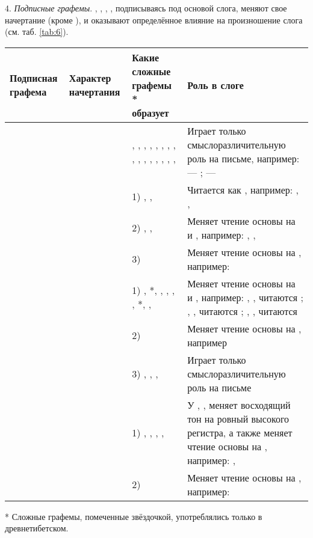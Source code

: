 4. \emph{Подписные графемы}. , , , , подписываясь под основой слога, меняют свое начертание (кроме ), и оказывают определённое влияние на произношение слога (см. таб. \ref{tab:6}).

\begin{tabularx}{\textwidth}{|L{4}|L{4}|L{10}|L{12}|}
	\caption{Подписные графемы}\label{tab:6}\\
	\hline
	Под\-пис\-ная гра\-фе\-ма & Ха\-рак\-тер на\-чер\-та\-ния & Какие сложные графемы * образует & Роль в слоге\\
	\hline
	\endhead
	 &  & , , , , , , , , , , , , , , , ,  & Играет только смыслоразличительную роль на письме, например:
	 --- ;
	 --- \\
	\hline
	 &  & 1) , ,  & Читается как , например: , , \\
	& & 2) , ,  & Меняет чтение основы на  и , например: , , \\
	& & 3)  & Меняет чтение основы на , например: \\
	\hline
	 &  & 1) , *, , , , , *, ,  & Меняет чтение основы на  и , например: , ,  читаются \toneR; , ,  читаются \toneR; , ,  читаются \toneV\\
	& & 2)  & Меняет чтение основы на , например \toneR\\
	& & 3) , , ,  & Играет только смыслоразличительную роль на письме\\
	\hline
	 &  & 1) , , , ,  & У , ,  меняет восходящий тон на ровный высокого регистра,  а также меняет чтение основы на , например: , \toneR\\
	& & 2)  & Меняет чтение основы на , например: \\
	\hline
\end{tabularx}
{\footnotesize{* Сложные графемы, помеченные звёздочкой, употреблялись только в древнетибетском.}}

